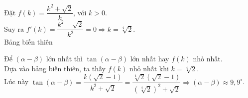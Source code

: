 \begin{ex}
{		Đặt $f(k)=\dfrac{k^2+\sqrt{2}}{k}$, với $k>0$.\\
		Suy ra $f'(k)=\dfrac{k^2-\sqrt{2}}{k^2}=0\Rightarrow k=\sqrt[4]{2}$.\\
		Bảng biến thiên
		\begin{center}
		\end{center}
		Để $(\alpha-\beta)$ lớn nhất thì $\tan(\alpha-\beta)$ lớn nhất hay $f(k)$ nhỏ nhất.\\
		Dựa vào bảng biến thiên, ta thấy $f(k)$ nhỏ nhất khi $k=\sqrt[4]{2}$.\\
		Lúc này $\tan(\alpha-\beta)=\dfrac{k\left(\sqrt{2}-1\right)}{k^2+\sqrt{2}}=\dfrac{\sqrt[4]{2}\left(\sqrt{2}-1\right)}{\left(\sqrt[4]{2}\right)^2+\sqrt{2}} \Rightarrow (\alpha-\beta) \approx 9{,}9^\circ$.
	}
\end{ex}

